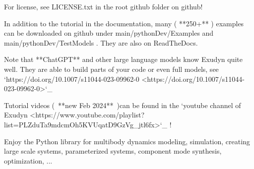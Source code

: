 {For license, see LICENSE.txt in the root github folder on github!

In addition to the tutorial in the documentation, many ( **250+** ) examples can be downloaded on github under main/pythonDev/Examples and main/pythonDev/TestModels . They are also on ReadTheDocs.

Note that **ChatGPT** and other large language models know Exudyn quite well. They are able to build parts of your code or even full models, see `https://doi.org/10.1007/s11044-023-09962-0 <https://doi.org/10.1007/s11044-023-09962-0>`_

Tutorial videos (\ **new Feb 2024**\ )can be found in the `youtube channel of Exudyn <https://www.youtube.com/playlist?list=PLZduTa9mdcmOh5KVUqatD9GzVg_jtl6fx>`_ !

Enjoy the Python library for multibody dynamics modeling, simulation, creating large scale systems, parameterized systems, component mode synthesis, optimization, ...
}

%
%

